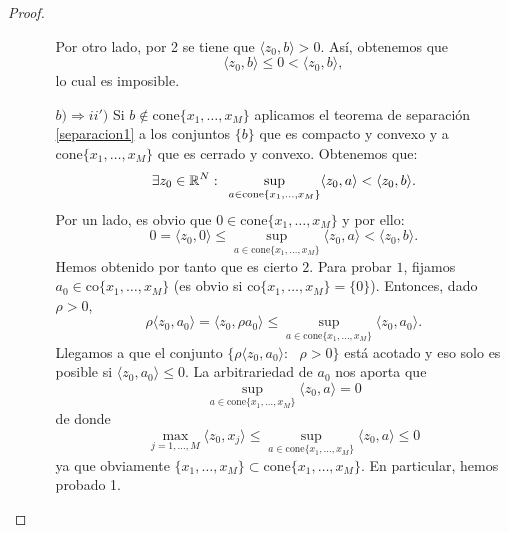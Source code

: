 \begin{proof}
\begin{itemize}
\begin{itemize}
			Por otro lado, por 2 se tiene que  $ \langle z_0, b\rangle > 0$. Así, obtenemos que
			\[
			\langle z_0, b \rangle \leq 0 <  \langle z_0, b \rangle,
			\]
			lo cual es imposible.
			\item[$ b) \Longrightarrow ii') $] Si $ b \notin \mathrm{cone}\{x_1,\dots, x_M \} $ aplicamos el teorema de separación \ref{separacion1} a los conjuntos $ \{b\} $ que es compacto y convexo y a $ \mathrm{cone}\{x_1,\dots, x_M \} $ que es cerrado y convexo. Obtenemos que:
			\[
			\exists z_0 \in \mathbb{R}^N: \text{ } \sup_{a \in \mathrm{cone}\{x_1,\dots, x_M \}} \langle z_0, a \rangle < \langle z_0, b \rangle.
			\]
			Por un lado, es obvio que $ 0 \in \mathrm{cone}\{x_1,\dots, x_M \} $ y por ello:
			\[
			0 = \langle z_0, 0\rangle \leq \sup_{a \in \mathrm{cone}\{x_1,\dots, x_M \}} \langle z_0, a \rangle < \langle z_0, b \rangle.
			\]
			Hemos obtenido por tanto que es cierto $ 2 $. Para probar $ 1 $, fijamos $ a_0 \in \mathrm{co}\{x_1,\dots, x_M \}$ (es obvio si $ \mathrm{co}\{x_1,\dots, x_M \} = \{0\}$). Entonces, dado $ \rho > 0 $,
			\[
			\rho\langle z_0, a_0 \rangle = \langle z_0, \rho a_0 \rangle \leq \sup_{a \in \mathrm{cone}\{x_1,\dots, x_M \}} \langle z_0, a_0 \rangle.
			\]
			Llegamos a que el conjunto $ \lbrace\rho\langle z_0, a_0 \rangle: \text{ } \rho > 0 \rbrace  $ está acotado y eso solo es posible si $ \langle z_0, a_0 \rangle \leq 0 $. La arbitrariedad de $ a_0 $ nos aporta que 
			\[ \sup_{a \in \mathrm{cone}\{x_1,\dots, x_M \}} \langle z_0, a \rangle= 0 \] de donde 
			\[
			\max_{ j=1,\dots,M} \langle z_0, x_j \rangle \leq \sup_{a \in \mathrm{cone}\{x_1,\dots, x_M \}} \langle z_0, a \rangle \leq 0  
			\]
			ya que obviamente $  \{x_1,\dots, x_M \} \subset \mathrm{cone}\{x_1,\dots, x_M \} $. En particular, hemos probado 1.
		\end{itemize}
	\end{itemize}
\end{proof}
\bigskip